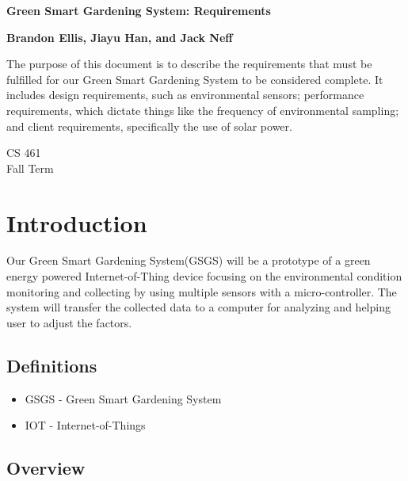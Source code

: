\documentclass[IEEEtran,letterpaper,10pt,titlepage,fleqn,draftclsnofoot,onecolumn]{article}
\begin{document}
\begin{titlepage}
	\begin{center}
		\vspace*{1cm}
		
		\huge
		\textbf{Green Smart Gardening System: Requirements}
        
        \vspace{1.5cm}
        
		\large
        \textbf{Brandon Ellis, Jiayu Han, and Jack Neff}
		
		\vspace{5cm}
    
    \normalsize
    The purpose of this document is to describe the requirements that must be fulfilled for our Green Smart Gardening System to be considered complete. It includes design requirements, such as environmental sensors; performance requirements, which dictate things like the frequency of environmental sampling; and client requirements, specifically the use of solar power.
		
		\vfill
        
		\large
        CS 461\\
        Fall Term\\
    \end{center}
\end{titlepage}

\section{Introduction}

Our Green Smart Gardening System(GSGS) will be a prototype of a green energy powered Internet-of-Thing device focusing on the environmental condition monitoring and collecting by using multiple sensors with a micro-controller. The system will transfer the collected data to a computer for analyzing and helping user to adjust the factors.

\subsection{Definitions}

\begin{itemize}
  \item GSGS - Green Smart Gardening System
  \item IOT  - Internet-of-Things
\end{itemize}

\subsection{Overview}
\end{document}
